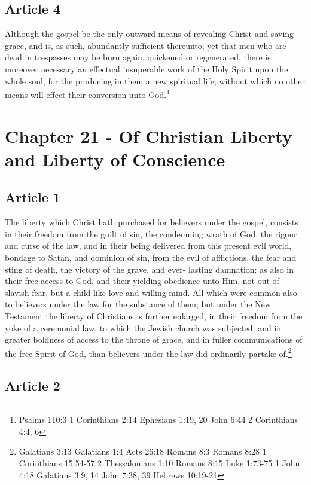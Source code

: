 \documentclass[12pt,letterpaper]{book}
\begin{document}
\section{Article 4}

Although the gospel be the only outward means of revealing Christ and saving grace, and is, as such, abundantly sufficient thereunto; yet that men who are dead in trespasses may be born again, quickened or regenerated, there is moreover necessary an effectual insuperable work of the Holy Spirit upon the whole soul, for the producing in them a new spiritual life; without which no other means will effect their conversion unto God.\footnote{Psalms 110:3 1 Corinthians 2:14 Ephesians 1:19, 20 John 6:44 2 Corinthians 4:4, 6}

\chapter{Chapter 21 - Of Christian Liberty and Liberty of Conscience}
\section{Article 1}

The liberty which Christ hath purchased for believers under the gospel, consists in their freedom from the guilt of sin, the condemning wrath of God, the rigour and curse of the law, and in their being delivered from this present evil world, bondage to Satan, and dominion of sin, from the evil of afflictions, the fear and sting of death, the victory of the grave, and ever- lasting damnation: as also in their free access to God, and their yielding obedience unto Him, not out of slavish fear, but a child-like love and willing mind.  All which were common also to believers under the law for the substance of them; but under the New Testament the liberty of Christians is further enlarged, in their freedom from the yoke of a ceremonial law, to which the Jewish church was subjected, and in greater boldness of access to the throne of grace, and in fuller communications of the free Spirit of God, than believers under the law did ordinarily partake of.\footnote{Galatians 3:13 Galatians 1:4 Acts 26:18 Romans 8:3 Romans 8:28 1 Corinthians 15:54-57 2 Thessalonians 1:10 Romans 8:15 Luke 1:73-75 1 John 4:18 Galatians 3:9, 14 John 7:38, 39 Hebrews 10:19-21}

\section{Article 2}
\end{document}

